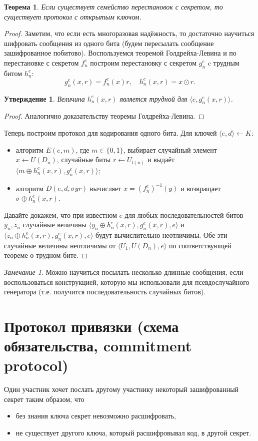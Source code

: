 \documentclass[12pt,a4paper]{article}
\newcommand{\bits}{\{0,1\}}
\theoremstyle{definition}
\theoremstyle{plain}
\newtheorem{theorem}{Теорема}[section]
\newtheorem{statement}{Утверждение}[section]
\theoremstyle{remark}
\newtheorem{remark}{Замечание}[section]
\begin{document}
\begin{theorem}
Если существует семейство перестановок с секретом, то существует протокол с открытым ключом.
\end{theorem}
\begin{proof}
Заметим, что если есть многоразовая надёжность, то достаточно научиться шифровать сообщения из
одного бита (будем пересылать сообщение зашифрованное побитово). 
Воспользуемся теоремой Голдрейха-Левина и по перестановке с секретом $f^e_n$ построим
перестановку с секретом $g^e_n$ c трудным битом $h^e_n$:
$$g^e_n(x,r) = f^e_n(x)r, \quad h^e_n(x,r) = x\odot r.$$
\begin{statement}
Величина $h^e_n(x, r)$ является трудной для $\langle e, g^e_n(x,r)\rangle$.
\end{statement}
\begin{proof}
Аналогично доказательству теоремы Голдрейха-Левина.
\end{proof}
Теперь построим протокол для кодирования одного бита. Для ключей $\langle e,d \rangle\gets K$:
\begin{itemize}
\item алгоритм $E(e, m)$, где $m \in\bits$, выбирает случайный элемент $x\gets U(D_n)$, случайные биты $r\gets U_{l(n)}$ и выдаёт $\langle m\oplus h^e_n(x,r), g_n^e(x,r)\rangle$;

\item алгоритм $D(e, d, \sigma y r)$ вычисляет $x = (f^e_n)^{-1}(y)$ и возвращает $\sigma\oplus h^e_n(x,r)$.
\end{itemize}
Давайте докажем, что при известном $e$ для любых последовательностей битов $y_n,z_n$ случайные величины $\langle y_n\oplus h^e_n(x,r), g^e_n(x,r), e \rangle$ и $\langle z_n\oplus h^e_n(x,r), g^e_n(x,r), e \rangle$ будут вычислительно неотличимы. Обе эти случайные величины неотличимы от 
$\langle U_1, U(D_n), e\rangle$ по соответствующей теореме о трудном бите.
\end{proof}
\begin{remark}
Можно научиться посылать несколько длинные сообщения, если воспользоваться конструкцией,
которую мы использовали для псевдослучайного генератора (т.е. получится последовательность случайных битов).
\end{remark}

\section{Протокол привязки (схема обязательства, commitment protocol)}
Один участник хочет послать другому участнику некоторый зашифрованный секрет таким образом,
что 
\begin{itemize}
\item без знания ключа секрет невозможно расшифровать,
\item не существует другого ключа, который расшифровывал код, в другой секрет.
\end{itemize}
\end{document}
